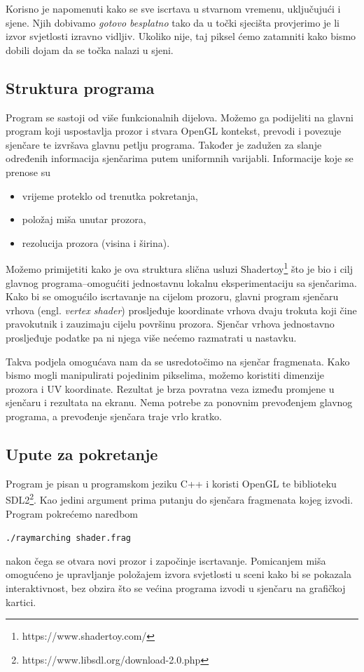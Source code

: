 \documentclass[a4paper,12pt]{article}
\newcommand{\eng}[1]{(engl. \textsl{#1}\/)}
\begin{document}
Korisno je napomenuti kako se sve iscrtava u stvarnom vremenu, uključujući i sjene. Njih dobivamo \textsl{gotovo
besplatno} tako da u točki sjecišta provjerimo je li izvor svjetlosti izravno vidljiv. Ukoliko
nije, taj piksel ćemo zatamniti kako bismo dobili dojam da se točka nalazi u sjeni.

\subsection{Struktura programa}
Program se sastoji od više funkcionalnih dijelova. Možemo ga podijeliti na glavni program koji
uspostavlja prozor i stvara OpenGL kontekst, prevodi i povezuje sjenčare te izvršava glavnu petlju
programa. Također je zadužen za slanje određenih informacija sjenčarima putem uniformnih varijabli.
Informacije koje se prenose su
\begin{itemize}
\item vrijeme proteklo od trenutka pokretanja,
\item položaj miša unutar prozora,
\item rezolucija prozora (visina i širina).
\end{itemize}

Možemo primijetiti kako je ova struktura slična usluzi Shadertoy\footnote{https://www.shadertoy.com/} što je bio i cilj glavnog programa--omogućiti jednostavnu lokalnu eksperimentaciju sa sjenčarima.
Kako bi se omogućilo iscrtavanje na cijelom prozoru, glavni program sjenčaru vrhova \eng{vertex shader} prosljeđuje
koordinate vrhova dvaju trokuta koji čine pravokutnik i zauzimaju cijelu površinu prozora.
Sjenčar vrhova jednostavno prosljeđuje podatke pa ni njega više nećemo razmatrati u nastavku.

Takva podjela omogućava nam da se usredotočimo na sjenčar fragmenata. Kako bismo mogli manipulirati pojedinim pikselima, možemo
koristiti dimenzije prozora i UV koordinate. Rezultat je brza povratna veza između promjene u
sjenčaru i rezultata na ekranu. Nema potrebe za ponovnim prevođenjem glavnog programa, a prevođenje
sjenčara traje vrlo kratko.

\subsection{Upute za pokretanje}

Program je pisan u programskom jeziku C++ i koristi OpenGL te biblioteku SDL2\footnote{https://www.libsdl.org/download-2.0.php}. Kao jedini argument prima putanju do sjenčara fragmenata kojeg izvodi.
Program pokrećemo naredbom
\begin{center}
\verb|./raymarching shader.frag|
\end{center}
nakon čega se otvara novi prozor i započinje iscrtavanje. Pomicanjem miša omogućeno je upravljanje
položajem izvora svjetlosti u sceni kako bi se pokazala interaktivnost, bez obzira što se većina
programa izvodi u sjenčaru na grafičkoj kartici.
\end{document}
